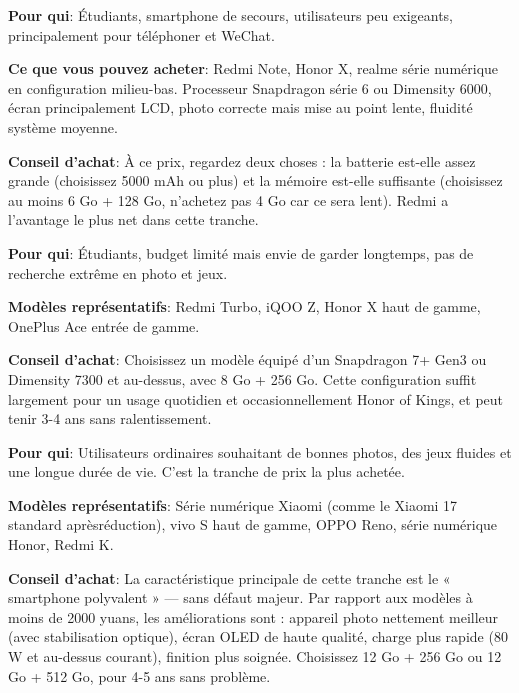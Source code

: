 
\textbf{Pour qui}: Étudiants, smartphone de secours, utilisateurs peu exigeants, principalement pour téléphoner et WeChat.

\textbf{Ce que vous pouvez acheter}: Redmi Note, Honor X, realme série numérique en configuration milieu-bas. Processeur Snapdragon série 6 ou Dimensity 6000, écran principalement LCD, photo correcte mais mise au point lente, fluidité système moyenne.

\textbf{Conseil d'achat}: À ce prix, regardez deux choses : la batterie est-elle assez grande (choisissez 5000 mAh ou plus) et la mémoire est-elle suffisante (choisissez au moins 6 Go + 128 Go, n'achetez pas 4 Go car ce sera lent). Redmi a l'avantage le plus net dans cette tranche.


\textbf{Pour qui}: Étudiants, budget limité mais envie de garder longtemps, pas de recherche extrême en photo et jeux.

\textbf{Modèles représentatifs}: Redmi Turbo, iQOO Z, Honor X haut de gamme, OnePlus Ace entrée de gamme.

\textbf{Conseil d'achat}: Choisissez un modèle équipé d'un Snapdragon 7+ Gen3 ou Dimensity 7300 et au-dessus, avec 8 Go + 256 Go. Cette configuration suffit largement pour un usage quotidien et occasionnellement Honor of Kings, et peut tenir 3-4 ans sans ralentissement.


\textbf{Pour qui}: Utilisateurs ordinaires souhaitant de bonnes photos, des jeux fluides et une longue durée de vie. C'est la tranche de prix la plus achetée.

\textbf{Modèles représentatifs}: Série numérique Xiaomi (comme le Xiaomi 17 standard aprèsréduction), vivo S haut de gamme, OPPO Reno, série numérique Honor, Redmi K.

\textbf{Conseil d'achat}: La caractéristique principale de cette tranche est le « smartphone polyvalent » — sans défaut majeur. Par rapport aux modèles à moins de 2000 yuans, les améliorations sont : appareil photo nettement meilleur (avec stabilisation optique), écran OLED de haute qualité, charge plus rapide (80 W et au-dessus courant), finition plus soignée. Choisissez 12 Go + 256 Go ou 12 Go + 512 Go, pour 4-5 ans sans problème.

